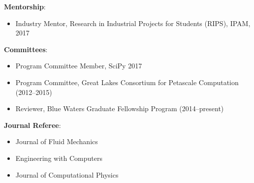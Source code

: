 
\textbf{Mentorship}:
\begin{itemize}
\itemsep 0pt
 \item Industry Mentor, Research in Industrial Projects for Students
       (RIPS), IPAM, 2017
\end{itemize}

\blankline


\textbf{Committees}:
\begin{itemize}
\itemsep 0pt
 \item Program Committee Member, SciPy 2017
 \item Program Committee, Great Lakes Consortium for Petascale Computation (2012--2015)
 \item Reviewer, Blue Waters Graduate Fellowship Program (2014--present)
\end{itemize}

\blankline

\textbf{Journal Referee}:
\begin{itemize}
\itemsep 0pt
 \item Journal of Fluid Mechanics
 \item Engineering with Computers
 \item Journal of Computational Physics
\end{itemize}
